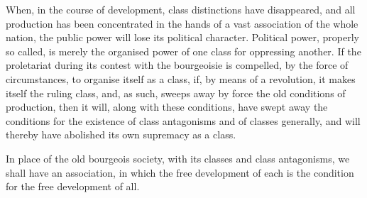 When, in the course of development, class distinctions have
disappeared, and all production has been concentrated in the hands of a
vast association of the whole nation, the public power will lose its
political character. Political power, properly so called, is merely the
organised power of one class for oppressing another. If the proletariat
during its contest with the bourgeoisie is compelled, by the force of
circumstances, to organise itself as a class, if, by means of a
revolution, it makes itself the ruling class, and, as such, sweeps away
by force the old conditions of production, then it will, along with
these conditions, have swept away the conditions for the existence of
class antagonisms and of classes generally, and will thereby have
abolished its own supremacy as a class.

In place of the old bourgeois society, with its classes and class
antagonisms, we shall have an association, in which the free
development of each is the condition for the free development of all.


